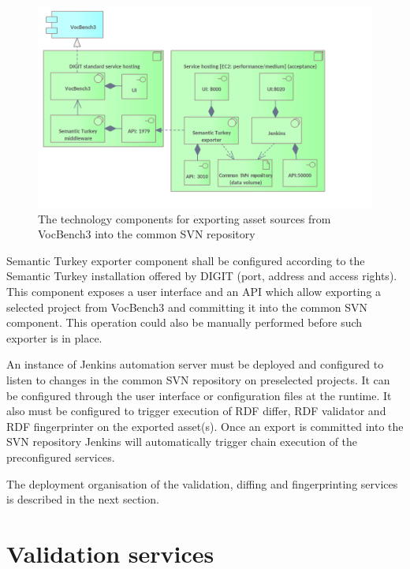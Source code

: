 	\begin{figure}[!h]
		\centering
		\includegraphics[width=\textwidth]{images/infra-setup/implementation.png}
		\caption{The technology components for exporting asset sources from VocBench3 into the common SVN repository}
		\label{fig:technology-view-implementation}
	\end{figure}
	
	Semantic Turkey exporter component shall be configured according to the Semantic Turkey installation offered by DIGIT (port, address and access rights). This component exposes a user interface and an API which allow exporting a selected project from VocBench3 and committing it into the common SVN component. This operation could also be manually performed before such exporter is in place. 
	
	An instance of Jenkins automation server must be deployed and configured to listen to changes in the common SVN repository on preselected projects. It can be configured through the user interface or configuration files at the runtime. It also must be configured to trigger execution of RDF differ, RDF validator and RDF fingerprinter on the exported asset(s). Once an export is committed into the SVN repository Jenkins will automatically trigger chain execution of the preconfigured services. 
	
	The deployment organisation of the validation, diffing and fingerprinting services is described in the next section. 
	
	
	\section{Validation services}
	\label{sec:technology-view-validation}
	
